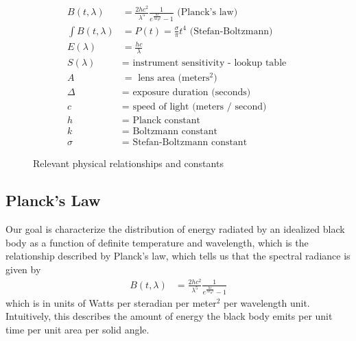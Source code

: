 \documentclass[11pt]{article}
\begin{document}
\begin{figure}[t!]
\begin{align*}
  B(t, \lambda) &= \frac{2 h c^2}{\lambda^5} \frac{1}{ e^{\frac{hc}{\lambda k_B t}} - 1} \text{ (Planck's law) } \\
  \int B(t, \lambda) &= P(t) = \frac{\sigma}{\pi} t^4  \text{ (Stefan-Boltzmann) }\\
  E(\lambda) &= \frac{hc}{\lambda} \\
  S(\lambda) &= \text{ instrument sensitivity - lookup table } \\
  A &= \text{ lens area (meters$^2$) } \\
  \Delta  &= \text{ exposure duration (seconds) } \\
  c &= \text{ speed of light (meters / second) } \\
  h &= \text{ Planck constant } \\
  k &= \text{ Boltzmann constant } \\
  \sigma &= \text{ Stefan-Boltzmann constant } 
\end{align*}
\caption{Relevant physical relationships and constants}
\end{figure}

\subsection{Planck's Law}
Our goal is characterize the distribution of energy radiated by an idealized black body as a function of definite temperature and wavelength, which is the relationship described by Planck's law, which tells us that the spectral radiance is given by
\begin{align}
  B(t, \lambda) &= \frac{2 h c^2}{\lambda^5} \frac{1}{ e^{\frac{hc}{\lambda k_B t}} - 1}
\end{align}
which is in units of Watts per steradian per meter$^2$ per wavelength unit.  Intuitively, this describes the amount of energy the black body emits per unit time per unit area per solid angle. 
\end{document}
